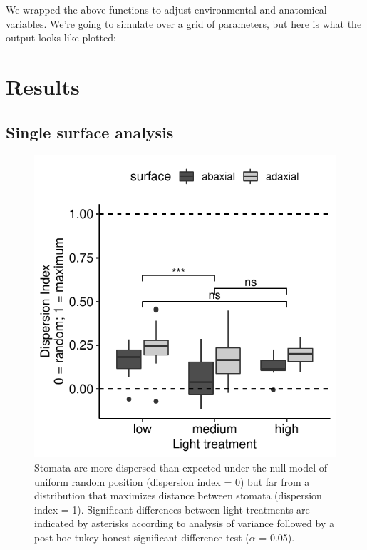 \documentclass[12pt,halfline,a4paper,]{ouparticle}
\begin{document}
We wrapped the above functions to adjust environmental and anatomical
variables. We're going to simulate over a grid of parameters, but here
is what the output looks like plotted:

\hypertarget{results-1}{%
\section{Results}\label{results-1}}

\hypertarget{single-surface-analysis}{%
\subsection{Single surface analysis}\label{single-surface-analysis}}

\begin{figure}[ht]
\includegraphics[width=\textwidth]{figures/single-surface.pdf}
\caption{Stomata are more dispersed than expected under the null model of uniform random position (dispersion index = 0) but far from a distribution that maximizes distance between stomata (dispersion index = 1). Significant differences between light treatments are indicated by asterisks according to analysis of variance followed by a post-hoc tukey honest significant difference test ($\alpha$ = 0.05).}
\label{fig:single-surface}
\end{figure}
\end{document}
